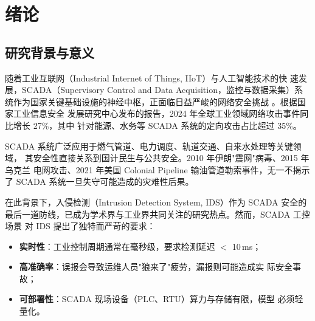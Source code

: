 
\chapter{绪论}
\label{chap:intro}

\section{研究背景与意义}
\label{sec:background}

\par 随着工业互联网（Industrial Internet of Things, IIoT）与人工智能技术的快
速发展，SCADA（Supervisory Control and Data Acquisition，监控与数据采集）系
统作为国家关键基础设施的神经中枢，正面临日益严峻的网络安全挑战
\cite{ref:scada_survey_2022,ref:iiot_security_2023}。根据国家工业信息安全
发展研究中心发布的报告，2024 年全球工业领域网络攻击事件同比增长 27\%，其中
针对能源、水务等 SCADA 系统的定向攻击占比超过 35\%。


\par SCADA 系统广泛应用于燃气管道、电力调度、轨道交通、自来水处理等关键领域，
其安全性直接关系到国计民生与公共安全。2010 年伊朗"震网"病毒、2015 年乌克兰
电网攻击、2021 年美国 Colonial Pipeline 输油管道勒索事件，无一不揭示了 SCADA
系统一旦失守可能造成的灾难性后果。


\par 在此背景下，入侵检测（Intrusion Detection System, IDS）作为 SCADA 安全的
最后一道防线，已成为学术界与工业界共同关注的研究热点。然而，SCADA 工控场景
对 IDS 提出了独特而严苛的要求：

\begin{itemize}
  \item \textbf{实时性}：工业控制周期通常在毫秒级，要求检测延迟 $<$ 10\,ms；
  \item \textbf{高准确率}：误报会导致运维人员"狼来了"疲劳，漏报则可能造成实
        际安全事故；
  \item \textbf{可部署性}：SCADA 现场设备（PLC、RTU）算力与存储有限，模型
        必须轻量化。
\end{itemize}

